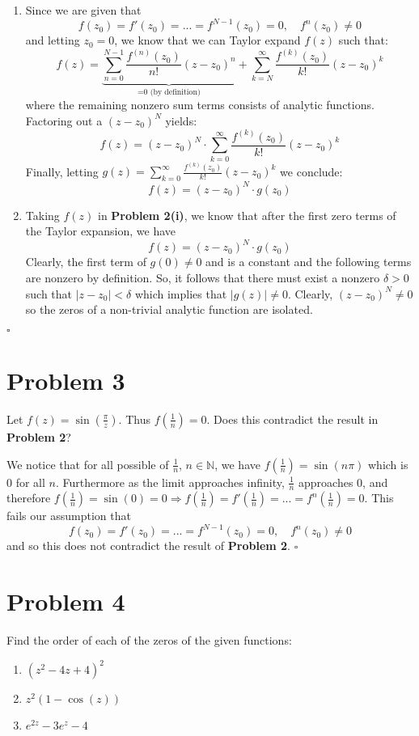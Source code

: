 \documentclass[12pt]{article}
\newcommand{\N}{\mathbb{N}}
\newenvironment{proof}{\noindent{\bf Proof.}}{\hfill $\square$\medskip}
\begin{document}
\begin{proof}
    \begin{enumerate}[label=\textbf{(\roman*)}]
        \item Since we are given that
        $$f(z_{0})=f'(z_{0})=...=f^{N-1}(z_{0})=0,\quad f^{n}(z_{0})\neq0$$
        and letting $z_{0} =0$, we know that we can Taylor expand $f(z)$ such that:
        $$f(z)=\underbrace{\sum_{n=0}^{N-1}\frac{f^{(n)}(z_{0})}{n!}(z-z_{0})^{n}}_\text{=0 (by definition)}+\sum_{k=N}^{\infty}\frac{f^{(k)}(z_{0})}{k!}(z-z_{0})^{k}$$
        where the remaining nonzero sum terms consists of analytic functions. Factoring out a $(z-z_{0})^{N}$ yields:
        $$f(z)=(z-z_{0})^{N}\cdot\sum_{k=0}^{\infty}\frac{f^{(k)}(z_{0})}{k!}(z-z_{0})^{k}$$
        Finally, letting $g(z)=\sum_{k=0}^{\infty}\frac{f^{(k)}(z_{0})}{k!}(z-z_{0})^{k}$ we conclude:
        $$f(z)=(z-z_{0})^{N}\cdot g(z_{0})$$
        \item Taking $f(z)$ in \textbf{Problem 2(i)}, we know that after the first zero terms of the Taylor expansion, we have 
        $$f(z)=(z-z_{0})^{N}\cdot g(z_{0})$$
        Clearly, the first term of $g(0)\neq 0$ and is a constant and the following terms are nonzero by definition. So, it follows that there must exist a nonzero $\delta>0$ such that $\left|z-z_{0}\right|<\delta$ which implies that $\left|g(z)\right|\neq0$. Clearly, $(z-z_{0})^{N}\neq0$ so the zeros of a non-trivial analytic function are isolated.
    \end{enumerate}
\end{proof}


\newpage
\section{Problem 3}
Let $f(z)=\sin(\frac{\pi}{z})$. Thus $f(\frac{1}{n})=0$. Does this contradict the result in \textbf{Problem 2}?

\begin{proof}
We notice that for all possible of $\frac{1}{n}$, $n\in\N$, we have $f(\frac{1}{n})=\sin(n\pi)$ which is $0$ for all $n$. Furthermore as the limit approaches infinity, $\frac{1}{n}$ approaches $0$, and therefore $f(\frac{1}{n})=\sin(0)=0\Rightarrow f(\frac{1}{n})=f'(\frac{1}{n})=...=f^{n}(\frac{1}{n})=0$. This fails our assumption that 
$$f(z_{0})=f'(z_{0})=...=f^{N-1}(z_{0})=0,\quad f^{n}(z_{0})\neq0$$
and so this does not contradict the result of \textbf{Problem 2}.
\end{proof}


\newpage
\section{Problem 4}
Find the order of each of the zeros of the given functions:
\begin{enumerate}[label=\textbf{(\alph*)}]
    \item $(z^{2}-4z+4)^{2}$
    \item $z^{2}(1-\cos(z))$
    \item $e^{2z}-3e^{z}-4$
\end{enumerate}
\end{document}
